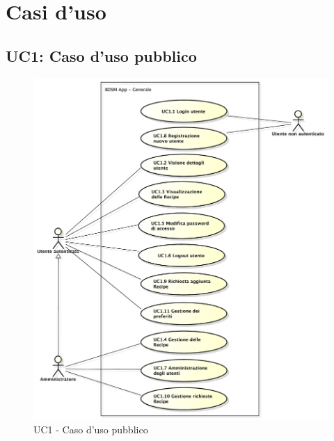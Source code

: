 


\section{Casi d'uso}

\subsection{UC1: Caso d'uso pubblico}
\begin{figure}[!htbp]
	\centering
	\centerline{\includegraphics[scale=0.45]{./images/UC1.pdf}}
	\caption{UC1 - Caso d'uso pubblico}
\end{figure}

